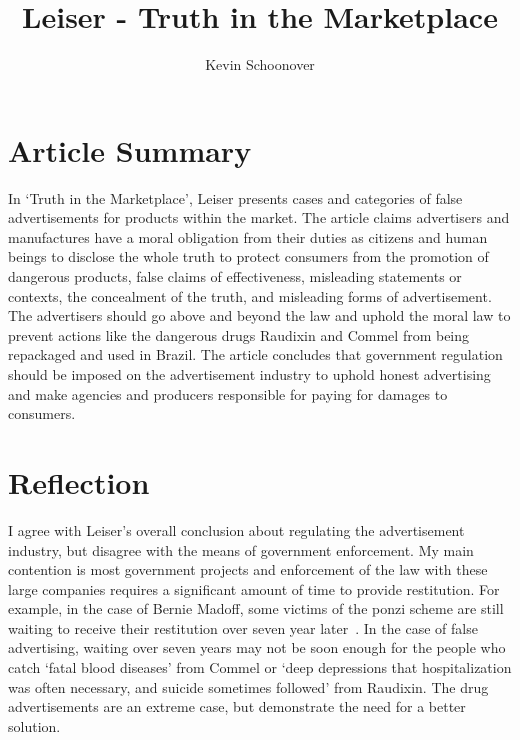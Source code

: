 \documentclass[12pt]{article}
\begin{document}
\title{Leiser - Truth in the Marketplace}
\author{Kevin Schoonover}

\maketitle

\section{Article Summary}
In `Truth in the Marketplace', Leiser presents cases and categories of false
advertisements for products within the market. The article claims advertisers and
manufactures have a moral obligation from their duties as citizens and human
beings to disclose the whole truth to protect consumers from the promotion of
dangerous products, false claims of effectiveness, misleading statements or
contexts, the concealment of the truth, and misleading forms of advertisement.
The advertisers should go above and beyond the law and uphold the moral law to
prevent actions like the dangerous drugs Raudixin and Commel from being
repackaged and used in Brazil. The article concludes that government regulation
should be imposed on the advertisement industry to uphold honest advertising and
make agencies and producers responsible for paying for damages to consumers.

\section{Reflection}
I agree with Leiser's overall conclusion about regulating the advertisement
industry, but disagree with the means of government enforcement. My main
contention is most government projects and enforcement of the law with these
large companies requires a significant amount of time to provide restitution.
For example, in the case of Bernie Madoff, some victims of the ponzi scheme are
still waiting to receive their restitution over seven year later~\cite{madoff}.
In the case of false advertising, waiting over seven years may not be soon
enough for the people who catch `fatal blood diseases' from Commel or `deep
depressions that hospitalization was often necessary, and suicide sometimes
followed' from Raudixin. The drug advertisements are an extreme case, but
demonstrate the need for a better solution.
\end{document}
